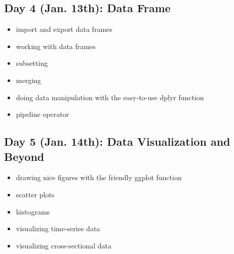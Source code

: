 \documentclass[11pt, a4paper]{article}
\begin{document}
\subsection*{Day 4 (Jan. 13th): Data Frame}

\begin{itemize}
   \item import and export data frames
   \item working with data frames
   \item subsetting
   \item merging
   \item doing data manipulation with the easy-to-use dplyr function
   \item pipeline operator
\end{itemize}


\subsection*{Day 5 (Jan. 14th): Data Visualization and Beyond}

\begin{itemize}
   \item drawing nice figures with the friendly ggplot function
   \item scatter plots 
   \item histograms
   \item visualizing time-series data
   \item visualizing cross-sectional data

\end{itemize}

\end{document}
